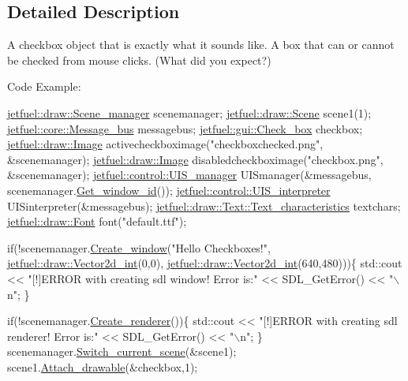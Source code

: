 \subsection{Detailed Description}
A checkbox object that is exactly what it sounds like. A box that can or cannot be checked from mouse clicks. (What did you expect?)

Code Example\+: 
\begin{DoxyCode}
\hyperlink{classjetfuel_1_1draw_1_1Scene__manager}{jetfuel::draw::Scene\_manager} scenemanager;
\hyperlink{classjetfuel_1_1draw_1_1Scene}{jetfuel::draw::Scene} scene1(1);
\hyperlink{classjetfuel_1_1core_1_1Message__bus}{jetfuel::core::Message\_bus} messagebus;
\hyperlink{classjetfuel_1_1gui_1_1Check__box}{jetfuel::gui::Check\_box} checkbox;
\hyperlink{classjetfuel_1_1draw_1_1Image}{jetfuel::draw::Image} activecheckboximage(\textcolor{stringliteral}{"checkboxchecked.png"},
                                         &scenemanager);
\hyperlink{classjetfuel_1_1draw_1_1Image}{jetfuel::draw::Image} disabledcheckboximage(\textcolor{stringliteral}{"checkbox.png"},
                                           &scenemanager);
\hyperlink{classjetfuel_1_1control_1_1UIS__manager}{jetfuel::control::UIS\_manager} UISmanager(&messagebus,
                                  scenemanager.\hyperlink{classjetfuel_1_1draw_1_1Scene__manager_a1758a86d40dcfaface8958fcd33676bf}{Get\_window\_id}());
\hyperlink{classjetfuel_1_1control_1_1UIS__interpreter}{jetfuel::control::UIS\_interpreter} UISinterpreter(&messagebus);
\hyperlink{structjetfuel_1_1draw_1_1Text_1_1Text__characteristics}{jetfuel::draw::Text::Text\_characteristics} textchars;
\hyperlink{classjetfuel_1_1draw_1_1Font}{jetfuel::draw::Font} font(\textcolor{stringliteral}{"default.ttf"});

\textcolor{keywordflow}{if}(!scenemanager.\hyperlink{classjetfuel_1_1draw_1_1Scene__manager_a5113e9062c272a22d383ba872417ba31}{Create\_window}(\textcolor{stringliteral}{"Hello Checkboxes!"},
                               \hyperlink{classjetfuel_1_1draw_1_1Vector2d}{jetfuel::draw::Vector2d\_int}(0,0),
                          \hyperlink{classjetfuel_1_1draw_1_1Vector2d}{jetfuel::draw::Vector2d\_int}(640,480)))\{
    std::cout << \textcolor{stringliteral}{"[!]ERROR with creating sdl window! Error is:"}
    << SDL\_GetError() << \textcolor{stringliteral}{"\(\backslash\)n"};
\}

\textcolor{keywordflow}{if}(!scenemanager.\hyperlink{classjetfuel_1_1draw_1_1Scene__manager_afafecd926ce5e4b2543a6d583a7d24b6}{Create\_renderer}())\{
    std::cout << \textcolor{stringliteral}{"[!]ERROR with creating sdl renderer! Error is:"}
    << SDL\_GetError() << \textcolor{stringliteral}{"\(\backslash\)n"};
\}
scenemanager.\hyperlink{classjetfuel_1_1draw_1_1Scene__manager_a770c163b88ba8427539ee182315ea989}{Switch\_current\_scene}(&scene1);
scene1.\hyperlink{classjetfuel_1_1draw_1_1Scene_aea4b4c4ae25c30d661be4c52787e0ea3}{Attach\_drawable}(&checkbox,1);


\end{DoxyCode}
